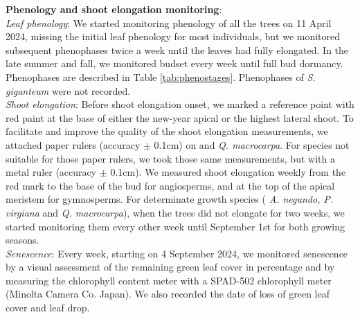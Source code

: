 \documentclass{article}
\begin{document}
\textbf{Phenology and shoot elongation monitoring}: \\
\textit{Leaf phenology}: We started monitoring phenology of all the trees on 11 April 2024, missing the initial leaf phenology for most individuals, but we monitored subsequent phenophases twice a week until the leaves had fully elongated. In the late summer and fall, we monitored budset every week until full bud dormancy. Phenophases are described in Table \ref{tab:phenostages}. Phenophases of \textit{S. giganteum} were not recorded. \\

\textit{Shoot elongation}: Before shoot elongation onset, we marked a reference point with red paint at the base of either the new-year apical or the highest lateral shoot. To facilitate and improve the quality of the shoot elongation measurements, we attached paper rulers (accuracy $\pm$ 0.1cm) on  and \textit{Q. macrocarpa}. For species not suitable for those paper rulers, we took those same measurements, but with a metal ruler (accuracy $\pm$ 0.1cm). We measured shoot elongation weekly from the red mark to the base of the bud for angiosperms, and at the top of the apical meristem for gymnosperms. For determinate growth species ( \textit{A. negundo, P. virgiana} and \textit{Q. macrocarpa}), when the trees did not elongate for two weeks, we started monitoring them every other week until September 1st for both growing seasons. \\

\textit{Senescence}: Every week, starting on 4 September 2024, we monitored senescence by a visual assessment of the remaining green leaf cover in percentage and by measuring the chlorophyll content meter with a SPAD-502 chlorophyll meter (Minolta Camera Co. Japan). We also recorded the date of loss of green leaf cover and leaf drop. \\
\end{document}
